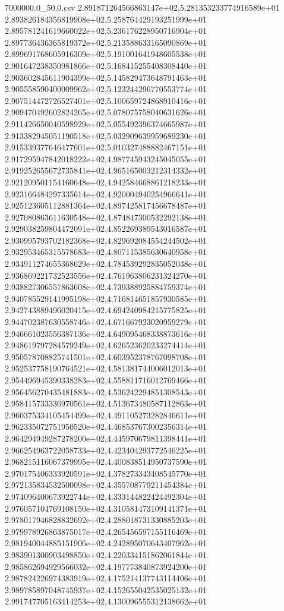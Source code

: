 \begin{filecontents*}{7000000.0_50.0.csv}
2.891871264566863147e+02,5.281353233774916589e+01
2.893826184356819908e+02,5.258764429193251999e+01
2.895781241619660022e+02,5.236176228950716904e+01
2.897736436365819372e+02,5.213588633165090869e+01
2.899691768605916309e+02,5.191001641948605538e+01
2.901647238350981866e+02,5.168415255408308440e+01
2.903602845611904399e+02,5.145829473648791463e+01
2.905558590400009962e+02,5.123244296770553774e+01
2.907514472726527401e+02,5.100659724868910416e+01
2.909470492602824265e+02,5.078075758040631626e+01
2.911426650040598929e+02,5.055492396374665987e+01
2.913382945051190518e+02,5.032909639959689230e+01
2.915339377646477601e+02,5.010327488882467151e+01
2.917295947842018222e+02,4.987745943245045055e+01
2.919252655672735841e+02,4.965165003212314332e+01
2.921209501154160648e+02,4.942584668861218233e+01
2.923166484297335614e+02,4.920004940254966641e+01
2.925123605112881364e+02,4.897425817456678487e+01
2.927080863611630548e+02,4.874847300532292138e+01
2.929038259804472091e+02,4.852269389543016587e+01
2.930995793702182368e+02,4.829692084554244502e+01
2.932953465315578683e+02,4.807115385630640958e+01
2.934911274655368629e+02,4.784539292835052038e+01
2.936869221732523556e+02,4.761963806231324270e+01
2.938827306557863608e+02,4.739388925884759374e+01
2.940785529141995198e+02,4.716814651857930585e+01
2.942743889496020415e+02,4.694240984215775825e+01
2.944702387630558746e+02,4.671667923020959279e+01
2.946661023556387136e+02,4.649095468338873616e+01
2.948619797284579249e+02,4.626523620233274414e+01
2.950578708825741501e+02,4.603952378767098708e+01
2.952537758190764521e+02,4.581381744006012013e+01
2.954496945390338283e+02,4.558811716012769466e+01
2.956456270435481883e+02,4.536242294851308543e+01
2.958415733336970561e+02,4.513673480587112863e+01
2.960375334105454499e+02,4.491105273282846611e+01
2.962335072751950520e+02,4.468537673002356314e+01
2.964294949287278200e+02,4.445970679811398441e+01
2.966254963722058733e+02,4.423404293772546225e+01
2.968215116067379995e+02,4.400838514950737590e+01
2.970175406333920591e+02,4.378273343408545770e+01
2.972135834532500098e+02,4.355708779211454384e+01
2.974096400673922744e+02,4.333144822424492304e+01
2.976057104769108150e+02,4.310581473109141371e+01
2.978017946828832692e+02,4.288018731330885203e+01
2.979978926863875017e+02,4.265456597155116469e+01
2.981940044885151906e+02,4.242895070643407962e+01
2.983901300903498850e+02,4.220334151862061844e+01
2.985862694929566032e+02,4.197773840873924200e+01
2.987824226974383919e+02,4.175214137743114406e+01
2.989785897048745937e+02,4.152655042535025132e+01
2.991747705163414253e+02,4.130096555312138662e+01

\end{filecontents*}
